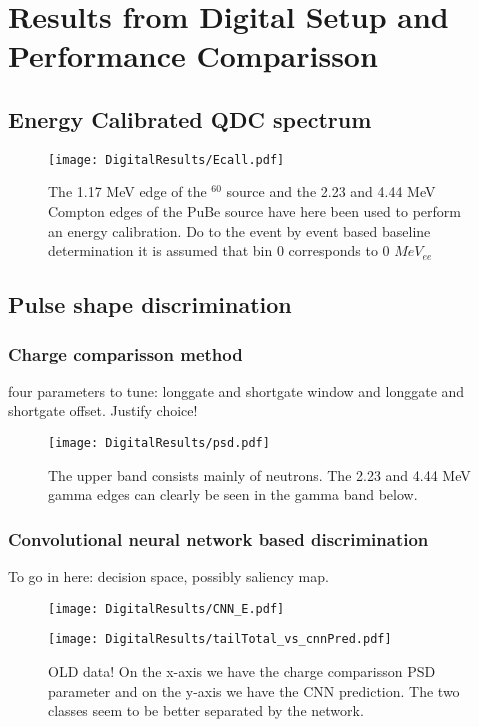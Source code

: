 \documentclass[main.tex]{subfiles}
\begin{document}
\section{Results from Digital Setup and Performance Comparisson}
\subsection{Energy Calibrated QDC spectrum}
\begin{figure}[ht]
    \centering
        \texttt{[image: DigitalResults/Ecall.pdf]}
        \caption{The 1.17 MeV edge of the $^60$ source and the 2.23 and 4.44 MeV Compton edges of the PuBe source have here been used to perform an energy calibration. Do to the event by event based baseline determination it is assumed that bin 0 corresponds to 0 $MeV_{ee}$}
    \label{fig:D_QDC}
\end{figure}



\subsection{Pulse shape discrimination}
\subsubsection{Charge comparisson method}
four parameters to tune: longgate and shortgate window and longgate and shortgate offset. Justify choice!
\begin{figure}[ht!]
    \centering
        \texttt{[image: DigitalResults/psd.pdf]}
        \caption{The upper band consists mainly of neutrons. The 2.23 and 4.44 MeV gamma edges can clearly be seen in the gamma band below.}
        \label{fig:hex_a}
\end{figure}

\subsubsection{Convolutional neural network based discrimination}
To go in here: decision space, possibly saliency map.

\begin{figure}[ht!]
    \centering
        \texttt{[image: DigitalResults/CNN\_E.pdf]}
        \caption{}
    \label{fig:cnn_E} 
\end{figure}

\begin{figure}[ht!]
    \centering
        \texttt{[image: DigitalResults/tailTotal\_vs\_cnnPred.pdf]}
        \caption{OLD data! On the x-axis we have the charge comparisson PSD parameter and on the y-axis we have the CNN prediction. The two classes seem to be better separated by the network.}
    \label{fig:tof_ps_d} 
\end{figure}
\end{document}
